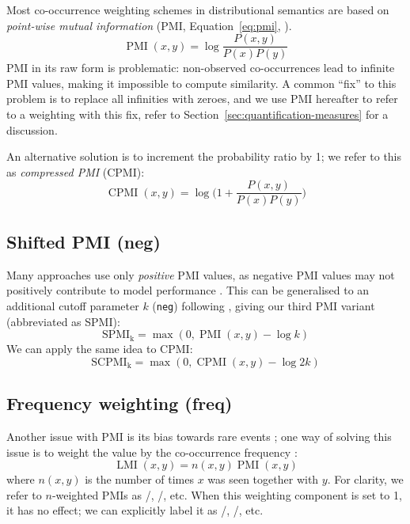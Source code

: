 Most co-occurrence weighting schemes in distributional semantics are based on \emph{point-wise mutual information} (PMI, Equation~\ref{eq:pmi}, ).
%
\begin{equation}
  \label{eq:pmi}
  \operatorname{PMI}(x, y) = \log\frac{P(x,y)}{P(x)P(y)}
\end{equation}
%
PMI in its raw form is problematic: non-observed co-occurrences lead to infinite PMI values, making it impossible to compute similarity. A common ``fix'' to this problem is to replace all infinities with zeroes, and we use PMI hereafter to refer to a weighting with this fix, refer to Section~\ref{sec:quantification-measures} for a discussion.

An alternative solution is to increment the probability ratio by 1; we refer to this as \textit{compressed PMI} (CPMI):
%
\begin{equation}
  \label{eq:cpmi}
  \operatorname{CPMI}(x, y) = \log\Big( 1 + \frac{P(x,y)}{P(x)P(y)} \Big)
\end{equation}

\subsection{Shifted PMI (neg)}
\label{sec:shifted-pmi}

Many approaches use only \emph{positive} PMI values, as  negative PMI values may not positively contribute to model performance \cite{Turney:2010:FMV:1861751.1861756}. This can be generalised to an additional cutoff parameter $k$ (\texttt{neg}) following , giving our third PMI variant (abbreviated as SPMI):
%
\begin{equation}
  \label{eq:ppmi}
  \operatorname{SPMI_k} = \max (0, \operatorname{PMI}(x, y) - \log k)
\end{equation}
%
We can apply the same idea to CPMI:
%
\begin{equation}
  \label{eq:pcpmi}
  \operatorname{SCPMI_k} = \max (0, \operatorname{CPMI}(x, y) - \log 2k)
\end{equation}

\subsection{Frequency weighting (freq)}
\label{sec:frequency-weighting}

Another issue with PMI is its bias towards rare events \cite{TACL570}; one way of solving this issue is to weight the value by the co-occurrence frequency \cite{Evert05}:
%
\begin{equation}
  \label{eq:lmi}
  \operatorname{LMI}(x, y) = n(x, y)\operatorname{PMI}(x, y)
\end{equation}
%
where $n(x, y)$ is the number of times $x$ was seen together with $y$. For clarity, we refer to $n$-weighted PMIs as \NPMI/, \NSPMI/, etc. When this weighting component is set to 1, it has no effect; we can  explicitly label it as \PMI/, \SPMI/, etc.

